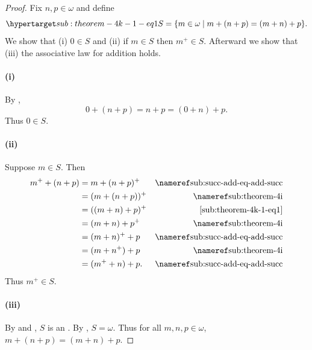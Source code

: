 \documentclass{report}
\begin{document}
  \begin{proof}

    Fix $n, p \in \omega$ and define
      \begin{equation}
        \hyperlabel{sub:theorem-4k-1-eq1}
        S = \{m \in \omega \mid m + (n + p) = (m + n) + p\}.
      \end{equation}
    We show that (i) $0 \in S$ and (ii) if $m \in S$ then $m^+ \in S$.
    Afterward we show that (iii) the associative law for addition holds.

    \paragraph{(i)}%

      By ,
        $$0 + (n + p) = n + p = (0 + n) + p.$$
      Thus $0 \in S$.

    \paragraph{(ii)}%

      Suppose $m \in S$.
      Then
        \begin{align*}
          m^+ + (n + p)
            & = m + (n + p)^+ & \textref{sub:succ-add-eq-add-succ} \\
            & = (m + (n + p))^+ & \textref{sub:theorem-4i} \\
            & = ((m + n) + p)^+ & \eqref{sub:theorem-4k-1-eq1} \\
            & = (m + n) + p^+ & \textref{sub:theorem-4i} \\
            & = (m + n)^+ + p & \textref{sub:succ-add-eq-add-succ} \\
            & = (m + n^+) + p & \textref{sub:theorem-4i} \\
            & = (m^+ + n) + p. & \textref{sub:succ-add-eq-add-succ}
        \end{align*}
      Thus $m^+ \in S$.

    \paragraph{(iii)}%

      By  and , $S$ is
        an .
      By , $S = \omega$.
      Thus for all $m, n, p \in \omega$, $m + (n + p) = (m + n) + p$.

  \end{proof}
\end{document}
